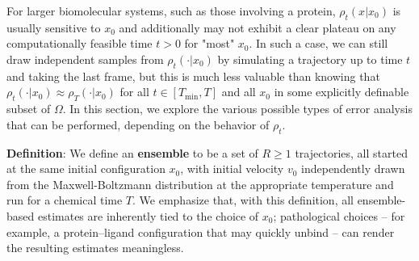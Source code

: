 \documentclass[9pt,bestpractices]{livecoms}
\begin{document}


For  larger biomolecular systems, such as those involving a protein, $\rho_t (x | x_0)$ is usually sensitive to $x_0$ and additionally may not exhibit a clear plateau on any computationally feasible time $t > 0$ for "most" $x_0$. In such a case, we can still draw independent samples from $\rho_t (\cdot | x_0)$ by simulating a trajectory up to time $t$ and taking the last frame, but this is much less valuable than knowing that $\rho_t (\cdot | x_0) \approx \rho_T (\cdot | x_0)$ for all $t \in [T_{\min}, T]$ and all $x_0$  in some explicitly definable subset of $\Omega$. In this section, we explore the various possible types of error analysis that can be performed, depending on the behavior of $\rho_t$. 


\textbf{Definition}:
We define an \textbf{ensemble} to be a set of $R \geqslant 1$ trajectories, all started at the same initial configuration $x_0$, with initial velocity $v_0$ independently drawn from the Maxwell-Boltzmann distribution at the appropriate temperature and run for a chemical time $T$. We emphasize that, with this definition, all ensemble-based estimates are inherently tied to the choice of $x_0$; pathological choices  -- for example, a protein–ligand configuration that may quickly unbind -- can render the resulting estimates meaningless.
\end{document}
